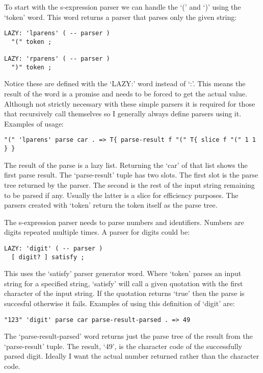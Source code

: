 To start with the s-expression parser we can handle the `(' and `)'
 using the `token' word. This word returns a parser that parses only
 the given string:

\begin{verbatim}
LAZY: 'lparens' ( -- parser )
  "(" token ;

LAZY: 'rparens' ( -- parser )
  ")" token ;
\end{verbatim}

Notice these are defined with the `LAZY:' word instead of `:'. This
means the result of the word is a promise and needs to be forced to
get the actual value. Although not strictly necessary with these
simple parsers it is required for those that recursively call
themselves so I generally always define parsers using it. Examples of
usage:

\begin{verbatim}
"(" 'lparens' parse car . => T{ parse-result f "(" T{ slice f "(" 1 1 } }
\end{verbatim}

The result of the parse is a lazy list. Returning the `car' of that
list shows the first parse result. The `parse-result' tuple has two
slots. The first slot is the parse tree returned by the parser. The
second is the rest of the input string remaining to be parsed if
any. Usually the latter is a slice for efficiency purposes. The
parsers created with `token' return the token itself as the parse
tree.

The s-expression parser needs to parse numbers and
identifiers. Numbers are digits repeated multiple times. A parser for
digits could be:

\begin{verbatim}
LAZY: 'digit' ( -- parser )
  [ digit? ] satisfy ;
\end{verbatim}

This uses the `satisfy' parser generator word. Where `token' parses an
input string for a specified string, `satisfy' will call a given
quotation with the first character of the input string. If the
quotation returns `true' then the parse is succesful otherwise it
fails. Examples of using this definition of `digit' are:

\begin{verbatim}
"123" 'digit' parse car parse-result-parsed . => 49
\end{verbatim}

The `parse-result-parsed' word returns just the parse tree of the
result from the `parse-result' tuple. The result, `49', is the
character code of the successfully parsed digit. Ideally I want the
actual number returned rather than the character code.

